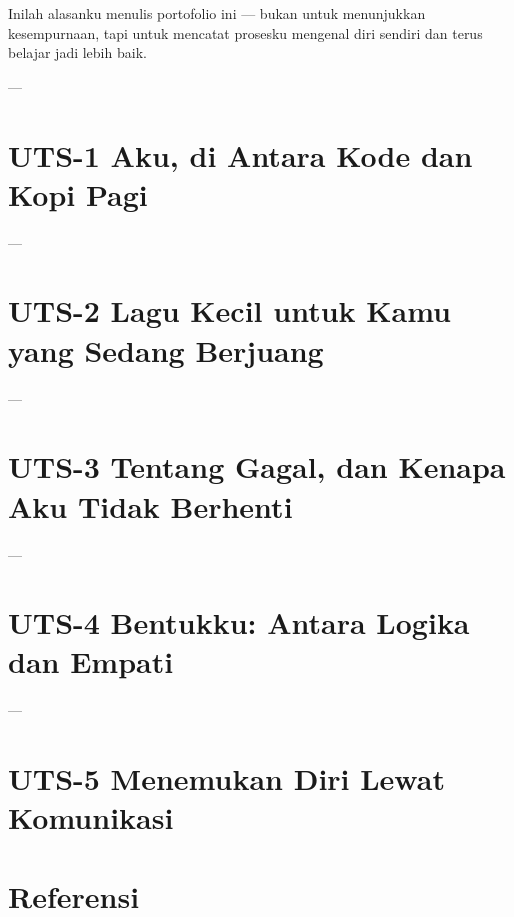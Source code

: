 Inilah alasanku menulis portofolio ini — bukan untuk menunjukkan kesempurnaan,  
tapi untuk mencatat prosesku mengenal diri sendiri dan terus belajar jadi lebih baik.

---



\chapter{UTS-1 Aku, di Antara Kode dan Kopi Pagi}\label{uts-1}


---

\chapter{UTS-2 Lagu Kecil untuk Kamu yang Sedang Berjuang}\label{uts-2}

---

\chapter{UTS-3 Tentang Gagal, dan Kenapa Aku Tidak Berhenti}\label{uts-3}

---

\chapter{UTS-4 Bentukku: Antara Logika dan Empati}\label{uts-4}

---

\chapter{UTS-5 Menemukan Diri Lewat Komunikasi}\label{uts-5}


\chapter*{Referensi}\label{referensi}

\label{refs}


